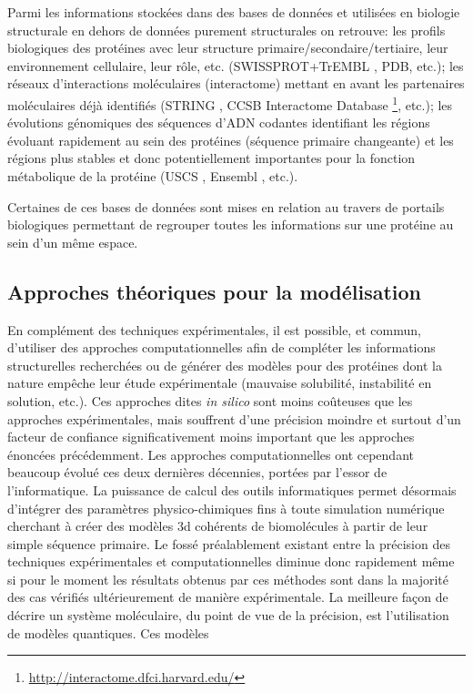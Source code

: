 Parmi les informations stockées dans des bases de données et utilisées en biologie structurale en dehors de données purement structurales on retrouve: les profils biologiques des protéines avec leur structure primaire/secondaire/tertiaire, leur environnement cellulaire, leur rôle, etc. (SWISSPROT+TrEMBL \cite{boeckmann2003swiss}, PDB, etc.); les réseaux d'interactions moléculaires (interactome) mettant en avant les partenaires moléculaires déjà identifiés (STRING \cite{Snel15092000}, CCSB Interactome Database \footnote{\url{http://interactome.dfci.harvard.edu/}}, etc.); les évolutions génomiques des séquences d'ADN codantes identifiant les régions évoluant rapidement au sein des protéines (séquence primaire changeante) et les régions plus stables et donc potentiellement importantes pour la fonction métabolique de la protéine (USCS \cite{kent2002human}, Ensembl \cite{hubbard2002ensembl}, etc.). 

Certaines de ces bases de données sont mises en relation au travers de portails biologiques permettant de regrouper toutes les informations sur une protéine au sein d'un même espace.

\subsection{Approches théoriques pour la modélisation}

En complément des techniques expérimentales, il est possible, et commun, d'utiliser des approches computationnelles afin de compléter les informations structurelles recherchées ou de générer des modèles pour des protéines dont la nature empêche leur étude expérimentale (mauvaise solubilité, instabilité en solution, etc.). Ces approches dites \textit{in silico} sont moins coûteuses que les approches expérimentales, mais souffrent d'une précision moindre et surtout d'un facteur de confiance significativement moins important que les approches énoncées précédemment. Les approches computationnelles ont cependant beaucoup évolué ces deux dernières décennies, portées par l'essor de l'informatique. La puissance de calcul des outils informatiques permet désormais d'intégrer des paramètres physico-chimiques fins à toute simulation numérique cherchant à créer des modèles 3d cohérents de biomolécules à partir de leur simple séquence primaire. Le fossé préalablement existant entre la précision des techniques expérimentales et computationnelles diminue donc rapidement même si pour le moment les résultats obtenus par ces méthodes sont dans la majorité des cas vérifiés ultérieurement de manière expérimentale. La meilleure façon de décrire un système moléculaire, du point de vue de la précision, est l'utilisation de modèles quantiques. Ces modèles 

